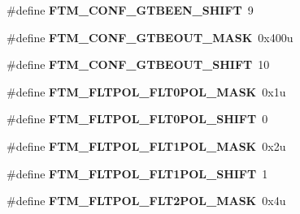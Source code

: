 \begin{DoxyCompactItemize}
\item 
\#define {\bfseries F\+T\+M\+\_\+\+C\+O\+N\+F\+\_\+\+G\+T\+B\+E\+E\+N\+\_\+\+S\+H\+I\+FT}~9\hypertarget{group__FTM__Register__Masks_ga08e28bc089eeea68a240bb8e716172d8}{}\label{group__FTM__Register__Masks_ga08e28bc089eeea68a240bb8e716172d8}

\item 
\#define {\bfseries F\+T\+M\+\_\+\+C\+O\+N\+F\+\_\+\+G\+T\+B\+E\+O\+U\+T\+\_\+\+M\+A\+SK}~0x400u\hypertarget{group__FTM__Register__Masks_ga172965c1d295c0edcc7454a96bc03430}{}\label{group__FTM__Register__Masks_ga172965c1d295c0edcc7454a96bc03430}

\item 
\#define {\bfseries F\+T\+M\+\_\+\+C\+O\+N\+F\+\_\+\+G\+T\+B\+E\+O\+U\+T\+\_\+\+S\+H\+I\+FT}~10\hypertarget{group__FTM__Register__Masks_gab3cdb8493cf40ad27cd27b513fc618ec}{}\label{group__FTM__Register__Masks_gab3cdb8493cf40ad27cd27b513fc618ec}

\item 
\#define {\bfseries F\+T\+M\+\_\+\+F\+L\+T\+P\+O\+L\+\_\+\+F\+L\+T0\+P\+O\+L\+\_\+\+M\+A\+SK}~0x1u\hypertarget{group__FTM__Register__Masks_gac9a93adce89d23693d4895ea49c95fb0}{}\label{group__FTM__Register__Masks_gac9a93adce89d23693d4895ea49c95fb0}

\item 
\#define {\bfseries F\+T\+M\+\_\+\+F\+L\+T\+P\+O\+L\+\_\+\+F\+L\+T0\+P\+O\+L\+\_\+\+S\+H\+I\+FT}~0\hypertarget{group__FTM__Register__Masks_gaced2a4f6b0cfb4d3f76b81ed36f56188}{}\label{group__FTM__Register__Masks_gaced2a4f6b0cfb4d3f76b81ed36f56188}

\item 
\#define {\bfseries F\+T\+M\+\_\+\+F\+L\+T\+P\+O\+L\+\_\+\+F\+L\+T1\+P\+O\+L\+\_\+\+M\+A\+SK}~0x2u\hypertarget{group__FTM__Register__Masks_gaa7b2fdfe55a6efb22cd8df8b071cac7c}{}\label{group__FTM__Register__Masks_gaa7b2fdfe55a6efb22cd8df8b071cac7c}

\item 
\#define {\bfseries F\+T\+M\+\_\+\+F\+L\+T\+P\+O\+L\+\_\+\+F\+L\+T1\+P\+O\+L\+\_\+\+S\+H\+I\+FT}~1\hypertarget{group__FTM__Register__Masks_ga9b9e4e91e33926535a3b8f981f3058d6}{}\label{group__FTM__Register__Masks_ga9b9e4e91e33926535a3b8f981f3058d6}

\item 
\#define {\bfseries F\+T\+M\+\_\+\+F\+L\+T\+P\+O\+L\+\_\+\+F\+L\+T2\+P\+O\+L\+\_\+\+M\+A\+SK}~0x4u\hypertarget{group__FTM__Register__Masks_ga0810edda6aa6e4a53808b33db2049072}{}\label{group__FTM__Register__Masks_ga0810edda6aa6e4a53808b33db2049072}


\end{DoxyCompactItemize}
